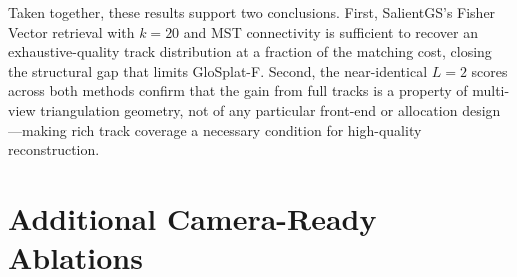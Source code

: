 \documentclass[sigconf]{acmart}
\begin{document}
\begin{table}[t]
\centering
\caption{Track-length cap ablation on MipNeRF360 (9-scene avg.). The front-end is fixed for each method; only the maximum retained observations per track varies.}
\label{tab:track_cap}
\end{table}

\noindent Taken together, these results support two conclusions. First, SalientGS's Fisher Vector retrieval with $k{=}20$ and MST connectivity is sufficient to recover an exhaustive-quality track distribution at a fraction of the matching cost, closing the structural gap that limits GloSplat-F. Second, the near-identical $L{=}2$ scores across both methods confirm that the gain from full tracks is a property of multi-view triangulation geometry, not of any particular front-end or allocation design---making rich track coverage a necessary condition for high-quality reconstruction.

\section{Additional Camera-Ready Ablations}
\label{sec:supp_camera_ready_ablations}
\end{document}

